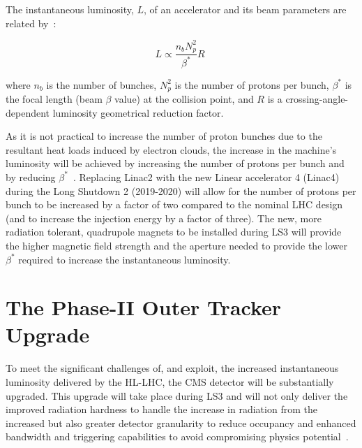 The instantaneous luminosity, $L$, of an accelerator and its beam parameters are related by~\cite{ApollinariG.:2017ojx}: 

\begin{equation}
L \propto \frac{n_{b}N^{2}_{p}}{\beta^{*}} R  \;
\label{eq:machineLumi}
\end{equation}

where $n_{b}$ is the number of bunches, $N^{2}_{p}$ is the number of protons per bunch, $\beta^{*}$ is the focal length (beam $\beta$ value) at the collision point, and $R$ is a crossing-angle-dependent luminosity geometrical reduction factor.

As it is not practical to increase the number of proton bunches due to the resultant heat loads induced by electron clouds, the increase in the machine's luminosity will be achieved by increasing the number of protons per bunch and by reducing $\beta^{*}$~\cite{ApollinariG.:2017ojx}.
Replacing Linac2 with the new Linear accelerator 4 (Linac4)~\cite{linac4} during the Long Shutdown 2 (2019-2020) will allow for the number of protons per bunch to be increased by a factor of two compared to the nominal LHC design (and to increase the injection energy by a factor of three).
The new, more radiation tolerant, quadrupole magnets to be installed during LS3 will provide the higher magnetic field strength and the aperture needed to provide the lower $\beta^{*}$ required to increase the instantaneous luminosity. 

\section{The Phase-II Outer Tracker Upgrade}\label{sec:tk-upgrade}
To meet the significant challenges of, and exploit, the increased instantaneous luminosity delivered by the HL-LHC, the CMS detector will be substantially upgraded.
This upgrade will take place during LS3 and will not only deliver the improved radiation hardness to handle the increase in radiation from the increased \PU but also greater detector granularity to reduce occupancy and enhanced bandwidth and triggering capabilities to avoid compromising physics potential~\cite{P2TrackerTDR,CMS_Upgrade_TP}.

